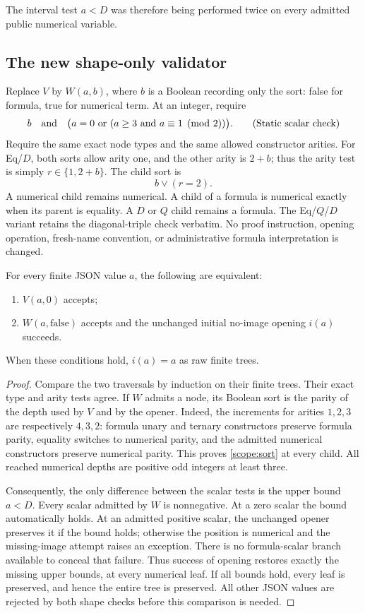 The interval test $a<D$ was therefore being performed twice on every
admitted public numerical variable.

\subsection{The new shape-only validator}

Replace $V$ by $W(a,b)$, where $b$ is a Boolean recording only the sort:
false for formula, true for numerical term. At an integer, require
\[
 b\quad\hbox{and}\quad
 \bigl(a=0\ \hbox{or}\ (a\geq3\ \hbox{and}\ a\equiv1\pmod2)\bigr).
 \tag{Static scalar check}\label{scope:newscalar}
\]
Require the same exact node types and the same allowed constructor
arities. For Eq/$D$, both sorts allow arity one, and the other arity is
$2+b$; thus the arity test is simply $r\in\{1,2+b\}$.
The child sort is
\[
                         b\lor(r=2).
 \tag{Child sort}\label{scope:sort}
\]
A numerical child remains numerical. A child of a formula is numerical
exactly when its parent is equality. A $D$ or $Q$ child remains a formula.
The Eq/$Q$/$D$ variant retains the diagonal-triple check verbatim.
No proof instruction, opening operation, fresh-name convention, or
administrative formula interpretation is changed.

\begin{lemma}
\label{scope:factor}
For every finite JSON value $a$, the following are equivalent:
\begin{enumerate}
\item $V(a,0)$ accepts;
\item $W(a,\mathrm{false})$ accepts and the unchanged initial no-image
opening $i(a)$ succeeds.
\end{enumerate}
When these conditions hold, $i(a)=a$ as raw finite trees.
\end{lemma}
\begin{proof}
Compare the two traversals by induction on their finite trees.
Their exact type and arity tests agree. If $W$ admits a node, its Boolean
sort is the parity of the depth used by $V$ and by the opener. Indeed,
the increments for arities $1,2,3$ are respectively $4,3,2$:
formula unary and ternary constructors preserve formula parity,
equality switches to numerical parity, and the admitted numerical
constructors preserve numerical parity. This proves
\eqref{scope:sort} at every child. All reached numerical depths are
positive odd integers at least three.

Consequently, the only difference between the scalar tests is the upper
bound $a<D$. Every scalar admitted by $W$ is nonnegative. At a zero
scalar the bound automatically holds. At an admitted positive scalar,
the unchanged opener preserves it if the bound holds; otherwise the
position is numerical and the missing-image attempt raises an exception.
There is no formula-scalar branch available to conceal that failure.
Thus success of opening restores exactly the missing upper bounds,
at every numerical leaf. If all bounds hold, every leaf is preserved,
and hence the entire tree is preserved. All other JSON values are
rejected by both shape checks before this comparison is needed.
\end{proof}

